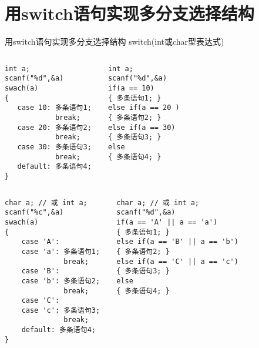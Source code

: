 \section{用switch语句实现多分支选择结构}

\begin{frame}{用switch语句实现多分支选择结构}
switch(int或char型表达式)
\begin{columns}[T]
\begin{lstlisting}
int a;
scanf("%d",&a)
swach(a)
{
   case 10: 多条语句1; 
            break;
   case 20: 多条语句2; 
            break;
   case 30: 多条语句3; 
            break;
   default: 多条语句4;
}
\end{lstlisting}
\begin{lstlisting}
int a;
scanf("%d",&a)
if(a == 10)
{ 多条语句1; } 
else if(a == 20 )
{ 多条语句2; } 
else if(a == 30) 
{ 多条语句3; }
else
{ 多条语句4; }
\end{lstlisting}
\end{columns}
\end{frame}

\begin{frame}
\begin{columns}[T]
\begin{lstlisting}
char a; // 或 int a;
scanf("%c",&a)
swach(a)
{
    case 'A':
    case 'a': 多条语句1; 
              break;
    case 'B':
    case 'b': 多条语句2; 
              break;
    case 'C':
    case 'c': 多条语句3; 
              break;
    default: 多条语句4;
}
\end{lstlisting}
\begin{lstlisting}	
char a; // 或 int a;
scanf("%d",&a)
if(a == 'A' || a == 'a')
{ 多条语句1; } 
else if(a == 'B' || a == 'b')
{ 多条语句2; } 
else if(a == 'C' || a == 'c') 
{ 多条语句3; }
else
{ 多条语句4; }
\end{lstlisting}
\end{columns}
\end{frame}

